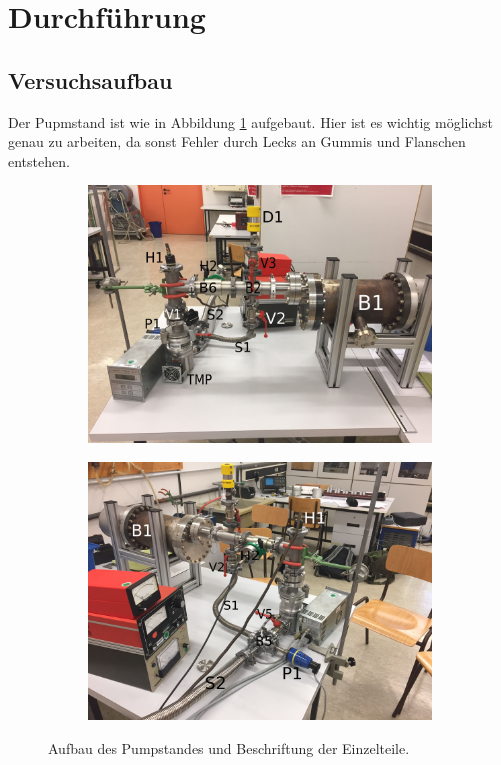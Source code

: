 \section{Durchführung}
\label{sec:Durchführung}

\subsection{Versuchsaufbau}
Der Pupmstand ist wie in Abbildung \ref{fig:Aufbau} aufgebaut. Hier ist es wichtig
möglichst genau zu arbeiten, da sonst Fehler durch Lecks an Gummis und Flanschen
entstehen.
\begin{figure}
  \begin{subfigure}[c]{0.5\textwidth}
    \includegraphics[width=\textwidth]{IMG_6888.JPG}
  \end{subfigure}
  \begin{subfigure}[c]{0.5\textwidth}
    \includegraphics[width=\textwidth]{IMG_6889.JPG}
  \end{subfigure}
  \caption{Aufbau des Pumpstandes und Beschriftung der Einzelteile.}
  \label{fig:Aufbau}
\end{figure}

